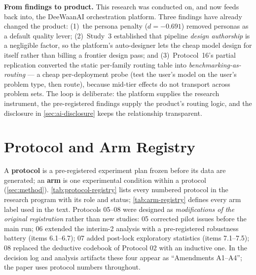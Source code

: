 \documentclass[12pt,a4paper]{article}
\begin{document}
\textbf{From findings to product.} This research was conducted on, and now
feeds back into, the DeeWaanAI orchestration platform. Three findings have
already changed the product: (1)~the persona penalty ($d = -0.691$) removed
personas as a default quality lever; (2)~Study~3 established that pipeline
\emph{design authorship} is a negligible factor, so the platform's
auto-designer lets the cheap model design for itself rather than billing a
frontier design pass; and (3)~Protocol~16's partial replication converted the
static per-family routing table into \emph{benchmarking-as-routing} --- a
cheap per-deployment probe (test the user's model on the user's problem type,
then route), because mid-tier effects do not transport across problem sets.
The loop is deliberate: the platform supplies the research instrument, the
pre-registered findings supply the product's routing logic, and the
disclosure in \cref{sec:ai-disclosure} keeps the relationship transparent.

\clearpage
\section{Protocol and Arm Registry}\label{app:registry}

A \textbf{protocol} is a pre-registered experiment plan frozen before its data
are generated; an \textbf{arm} is one experimental condition within a protocol
(\cref{sec:method}). \cref{tab:protocol-registry} lists every numbered
protocol in the research program with its role and status;
\cref{tab:arm-registry} defines every arm label used in the text.
Protocols 05--08 were designed as \emph{modifications of the original
registration} rather than new studies: 05 corrected pilot issues before the
main run; 06 extended the interim-2 analysis with a pre-registered robustness
battery (items 6.1--6.7); 07 added post-lock exploratory statistics (items
7.1--7.5); 08 replaced the deductive codebook of Protocol 02 with an inductive
one. In the decision log and analysis artifacts these four appear as
``Amendments A1--A4''; the paper uses protocol numbers throughout.
\end{document}
